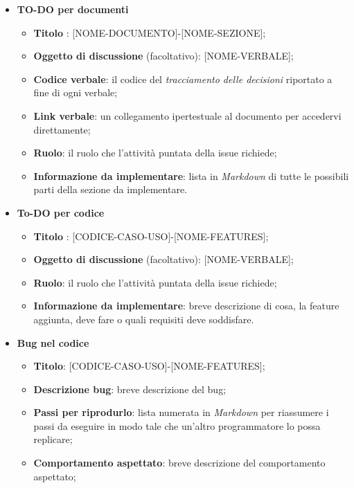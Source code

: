         \begin{itemize}
            \item  \textbf{TO-DO per documenti}
            \begin{itemize}
                \item \textbf{Titolo} : [NOME-DOCUMENTO]-[NOME-SEZIONE];
                \item \textbf{Oggetto di discussione} (facoltativo): [NOME-VERBALE];
                \item \textbf{Codice verbale}: il codice del \textit{tracciamento delle decisioni} riportato a fine di ogni verbale;
                \item \textbf{Link verbale}: un collegamento ipertestuale al documento per accedervi direttamente;
                \item \textbf{Ruolo}: il ruolo che l'attività puntata della issue richiede;
                \item \textbf{Informazione da implementare}: lista in \textit{Markdown} di tutte le possibili parti della sezione da implementare.
            \end{itemize}
            \item  \textbf{To-DO per codice}
            \begin{itemize}
                \item \textbf{Titolo} : [CODICE-CASO-USO]-[NOME-FEATURES];
                \item \textbf{Oggetto di discussione} (facoltativo): [NOME-VERBALE];
                \item \textbf{Ruolo}: il ruolo che l'attività puntata della issue richiede;
                \item \textbf{Informazione da implementare}: breve descrizione di cosa, la feature aggiunta, deve fare o quali requisiti deve soddisfare.
            \end{itemize}
            \item  \textbf{Bug nel codice}
            \begin{itemize}
                \item \textbf{Titolo}: [CODICE-CASO-USO]-[NOME-FEATURES];
                \item \textbf{Descrizione bug}: breve descrizione del bug;
                \item \textbf{Passi per riprodurlo}: lista numerata in \textit{Markdown} per riassumere i passi da eseguire in modo tale che un'altro programmatore lo possa replicare;
                \item \textbf{Comportamento aspettato}: breve descrizione del comportamento aspettato;

\end{itemize}
\end{itemize}
